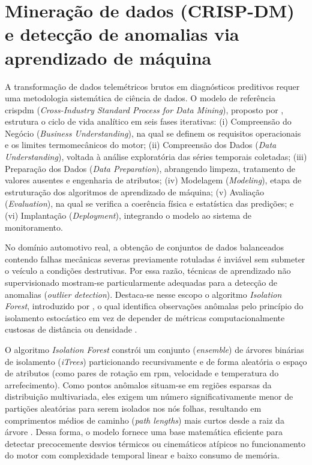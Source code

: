 \documentclass[
	12pt,				%
	openright,			%
	twoside,			%
	a4paper,			%
	english,			%
	brazil				%
	]{abntex2}
\begin{document}
\section{Mineração de dados (CRISP-DM) e detecção de anomalias via aprendizado de
máquina}\label{sec:crispdm_iforest}

A transformação de dados telemétricos brutos em diagnósticos preditivos requer uma
metodologia sistemática de ciência de dados. O modelo de referência \acrshort{crispdm}
(\textit{Cross-Industry Standard Process for Data Mining}), proposto por
, estrutura o ciclo de vida analítico em seis fases iterativas:
(i) Compreensão do Negócio (\textit{Business Understanding}), na qual se definem os
requisitos operacionais e os limites termomecânicos do motor; (ii) Compreensão dos Dados
(\textit{Data Understanding}), voltada à análise exploratória das séries temporais
coletadas; (iii) Preparação dos Dados (\textit{Data Preparation}), abrangendo limpeza,
tratamento de valores ausentes e engenharia de atributos; (iv) Modelagem
(\textit{Modeling}), etapa de estruturação dos algoritmos de aprendizado de máquina; (v)
Avaliação (\textit{Evaluation}), na qual se verifica a coerência física e estatística
das predições; e (vi) Implantação (\textit{Deployment}), integrando o modelo ao sistema
de monitoramento.

No domínio automotivo real, a obtenção de conjuntos de dados balanceados contendo falhas
mecânicas severas previamente rotuladas é inviável sem submeter o veículo a condições
destrutivas. Por essa razão, técnicas de aprendizado não supervisionado mostram-se
particularmente adequadas para a detecção de anomalias (\textit{outlier detection}).
Destaca-se nesse escopo o algoritmo \textit{Isolation Forest}, introduzido por
, o qual identifica observações anômalas pelo princípio do
isolamento estocástico em vez de depender de métricas computacionalmente custosas de
distância ou densidade \cite{geron2022}.

O algoritmo \textit{Isolation Forest} constrói um conjunto (\textit{ensemble}) de
árvores binárias de isolamento (\textit{iTrees}) particionando recursivamente e de forma
aleatória o espaço de atributos (como pares de rotação em \acrshort{rpm}, velocidade e
temperatura do arrefecimento). Como pontos anômalos situam-se em regiões esparsas da
distribuição multivariada, eles exigem um número significativamente menor de partições
aleatórias para serem isolados nos nós folhas, resultando em comprimentos médios de
caminho (\textit{path lengths}) mais curtos desde a raiz da árvore \cite{liu2008}. Dessa
forma, o modelo fornece uma base matemática eficiente para detectar precocemente desvios
térmicos ou cinemáticos atípicos no funcionamento do motor com complexidade temporal
linear e baixo consumo de memória.
\end{document}
